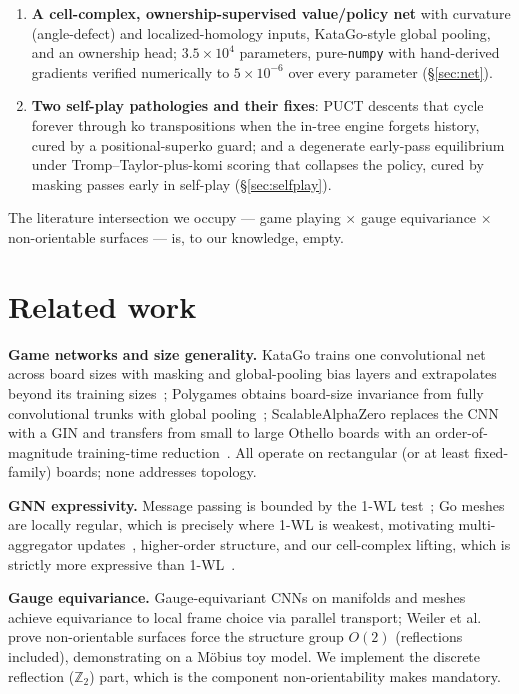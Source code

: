 \documentclass[11pt]{article}
\newcommand{\ZZ}{\mathbb{Z}}
\begin{document}
\begin{enumerate}
  so gradients reach the filter through supervision and attention while
  the masks themselves stay combinatorial (\S\ref{sec:filtration}).
\item \textbf{A cell-complex, ownership-supervised value/policy net} with
  curvature (angle-defect) and localized-homology inputs, KataGo-style
  global pooling, and an ownership head; $3.5\times 10^4$ parameters,
  pure-\texttt{numpy} with hand-derived gradients verified numerically to
  $5\times 10^{-6}$ over every parameter (\S\ref{sec:net}).
\item \textbf{Two self-play pathologies and their fixes}: PUCT descents
  that cycle forever through ko transpositions when the in-tree engine
  forgets history, cured by a positional-superko guard; and a degenerate
  early-pass equilibrium under Tromp--Taylor-plus-komi scoring that
  collapses the policy, cured by masking passes early in self-play
  (\S\ref{sec:selfplay}).
\end{enumerate}
The literature intersection we occupy --- game
playing $\times$ gauge equivariance $\times$ non-orientable surfaces ---
is, to our knowledge, empty.

\section{Related work}
\textbf{Game networks and size generality.} KataGo trains one
convolutional net across board sizes with masking and global-pooling bias
layers and extrapolates beyond its training
sizes~\cite{wu2019katago}; Polygames obtains board-size invariance from
fully convolutional trunks with global pooling~\cite{cazenave2020};
ScalableAlphaZero replaces the CNN with a GIN and transfers from small to
large Othello boards with an order-of-magnitude training-time
reduction~\cite{benassayag2021}. All operate on rectangular (or at least
fixed-family) boards; none addresses topology.

\textbf{GNN expressivity.} Message passing is bounded by the 1-WL
test~\cite{xu2019gin,morris2019wl}; Go meshes are locally regular, which
is precisely where 1-WL is weakest, motivating multi-aggregator
updates~\cite{corso2020pna}, higher-order structure, and our cell-complex
lifting, which is strictly more expressive than
1-WL~\cite{bodnar2021cwn}.

\textbf{Gauge equivariance.} Gauge-equivariant CNNs on manifolds and
meshes~\cite{cohen2019gauge,dehaan2021gem} achieve equivariance to local
frame choice via parallel transport; Weiler et
al.~\cite{weiler2021coordinate} prove non-orientable surfaces force the
structure group $O(2)$ (reflections included), demonstrating on a
M\"obius toy model. We implement the discrete reflection ($\ZZ_2$) part,
which is the component non-orientability makes mandatory.
\end{document}

